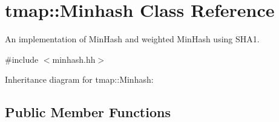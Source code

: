 \hypertarget{classtmap_1_1Minhash}{}\section{tmap\+:\+:Minhash Class Reference}
\label{classtmap_1_1Minhash}


An implementation of Min\+Hash and weighted Min\+Hash using S\+H\+A1.  




{\ttfamily \#include $<$minhash.\+hh$>$}



Inheritance diagram for tmap\+:\+:Minhash\+:
\subsection*{Public Member Functions}
